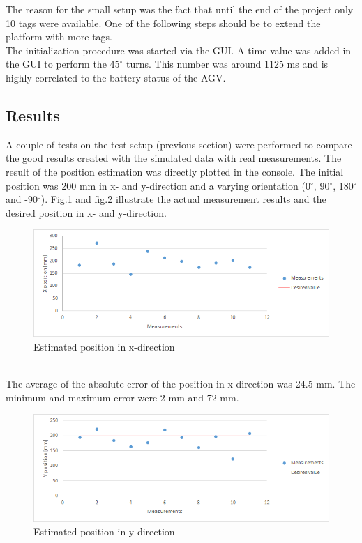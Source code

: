 The reason for the small setup was the fact that until the end of the project only 10 tags were available. One of the following steps should be to extend the platform with more tags.\\
The initialization procedure was started via the GUI. A time value was added in the GUI to perform the 45$^\circ$ turns. This number was around 1125 ms and is highly correlated to the battery status of the AGV.\\

\subsection{Results}
A couple of tests on the test setup (previous section) were performed to compare the good results created with the simulated data with real measurements. The result of the position estimation was directly plotted in the console. The initial position was 200 mm in x- and y-direction and a varying orientation (0$^\circ$, 90$^\circ$, 180$^\circ$ and -90$^\circ$). Fig.\ref{ResultX} and fig.\ref{ResultY} illustrate the actual measurement results and the desired position in x- and y-direction. 
\begin{figure}[!htbp]
\centering
\includegraphics[width = 14cm]{Pictures/ResultX}
\caption{Estimated position in x-direction}
\label{ResultX}
\end{figure}\\
The average of the absolute error of the position in x-direction was 24.5 mm. The minimum and maximum error were 2 mm and 72 mm.\\
\begin{figure}[!htbp]
\centering
\includegraphics[width = 14cm]{Pictures/ResultY}
\caption{Estimated position in y-direction}
\label{ResultY}
\end{figure}\\
